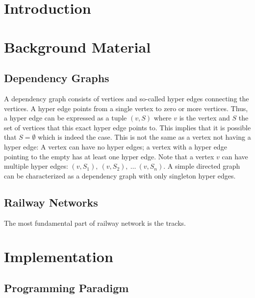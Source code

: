 \documentclass[a4paper, 12pt, twoside]{report}
\title{\thesistitle}
\author{\thesisauthor}
\date{\thedate}
\begin{document}


\chapter{Introduction} %
\label{chpt:introduction}


\chapter{Background Material} %
\label{chpt:background-material}

\section{Dependency Graphs} %
\label{sec:dependency-graphs}

A dependency graph consists of vertices and so-called hyper edges connecting the vertices. A hyper edge points from a single vertex to zero or more vertices. Thus, a hyper edge can be expressed as a tuple $(v, S)$ where $v$ is the vertex and $S$ the set of vertices that this exact hyper edge points to. This implies that it is possible that $S = \emptyset$ which is indeed the case. This is not the same as a vertex not having a hyper edge: A vertex can have no hyper edges; a vertex with a hyper edge pointing to the empty has at least one hyper edge. Note that a vertex $v$ can have multiple hyper edges: $(v, S_1),\ (v, S_2),\ \ldots\ (v,S_n)$. A simple directed graph can be characterized as a dependency graph with only singleton hyper edges. 


\section{Railway Networks} %
\label{sec:railway-networks}

The most fundamental part of railway network is the tracks. 


\chapter{Implementation} %
\label{chpt:implementation}


\section{Programming Paradigm} %
\label{sec:programming-paradigm}
\end{document}
